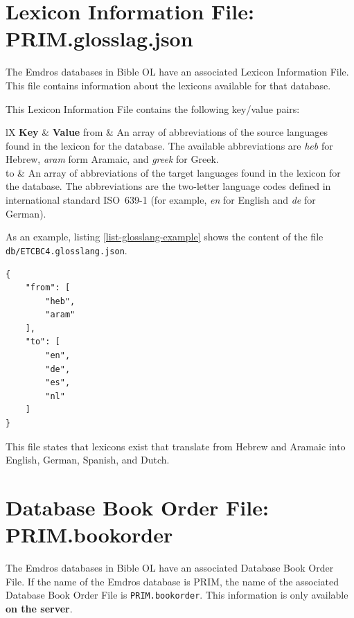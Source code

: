 \documentclass[11pt,oneside,a4paper]{memoir}
\makeatletter
\newenvironment{my-longtabu}[2]{
\begin{longtabu*}{@{}#1@{}}
  \toprule
  #2\\\addlinespace[-1mm]
  \midrule
  \endhead

  \emph{\rmfamily\normalsize(Continued...)} & \\
  \endfoot

  \addlinespace[-1mm]\bottomrule
  \endlastfoot
}{%
\end{longtabu*}
}
\newcommand{\headii}[2]{\textbf{#1} & \textbf{#2}}
\makeatother
\begin{document}
\section{Lexicon Information File: PRIM.glosslag.json}\label{sec-lif}

The Emdros databases in Bible OL have an associated Lexicon Information File. This file contains
information about the lexicons available for that database.

This Lexicon Information File contains the following key/value pairs:

\begin{my-longtabu}{lX}{ \headii{Key}{Value} }
  from & An array of abbreviations of the source languages found in the lexicon for the database.
  The available abbreviations are \emph{heb} for Hebrew, \emph{aram} form Aramaic, and \emph{greek}
  for Greek.\\

  to & An array of abbreviations of the target languages found in the lexicon for the database.
  The abbreviations are the two-letter language codes defined in international standard ISO~639-1
  (for example, \emph{en} for English and \emph{de} for German).\\
\end{my-longtabu}

As an example, listing \ref{list-glosslang-example} shows the content of the file
\texttt{db/ETCBC4.glosslang.json}.

\begin{lstlisting}[caption=A sample Lexicon Information file,label=list-glosslang-example]
{
    "from": [
        "heb",
        "aram"
    ],
    "to": [
        "en",
        "de",
        "es",
        "nl"
    ]
}
\end{lstlisting}

This file states that lexicons exist that translate from Hebrew and Aramaic into English, German,
Spanish, and Dutch.


\section{Database Book Order File: PRIM.bookorder}\label{sec-bookorder}

The Emdros databases in Bible OL have an associated Database Book Order File. If the name of
the Emdros database is PRIM, the name of the associated Database Book Order File is
\texttt{PRIM.bookorder}. This information is only available \textbf{on the server}.
\end{document}
